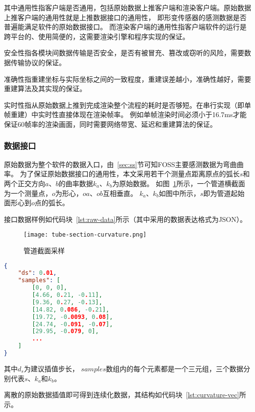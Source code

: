 其中通用性指客户端是否通用，包括原始数据上推客户端和渲染客户端。原始数据上推客户端的通用性就是上推数据接口的通用性，
即形变传感器的感测数据是否普遍能满足软件的原始数据接口。
而渲染客户端的通用性指客户端软件的运行是跨平台的、使用简便的，这需要渲染引擎和程序实现的保证。

安全性指各模块间数据传输是否安全，是否有被冒充、篡改或窃听的风险，需要数据传输协议的保证。

准确性指重建坐标与实际坐标之间的一致程度，重建误差越小，准确性越好，需要重建算法及其实现的保证。

实时性指从原始数据上推到完成渲染整个流程的耗时是否够短。在串行实现（即单帧重建）中实时性直接体现在渲染帧率。
例如单帧渲染时间必须小于16.7ms才能保证60帧率的渲染画面，同时需要网络带宽、延迟和重建算法的保证。

\subsubsection{数据接口}

原始数据为整个软件的数据入口，由~\ref{sec:ss}节可知FOSS主要感测数据为弯曲曲率。
为了保证原始数据接口的通用性，本文采用若干个测量点距离原点的弧长$s$和两个正交方向$a$、$b$的曲率数据$k_a$、$k_b$为原始数据。
如图~\ref{fig:tube-section}所示，一个管道横截面为一个测量点，$o$为形心，$oa$、$ob$互相垂直。
$k_a$、$k_b$如图中所示，$s$即为管道起始面形心到$o$点的弧长。

接口数据样例如代码块~\ref{lst:raw-data}所示（其中采用的数据表达格式为JSON\cite{rfc7159}）。

\begin{figure}
\centering
\texttt{[image: tube-section-curvature.png]}
\caption{管道截面采样}
\label{fig:tube-section} 
\end{figure}


\begin{lstlisting}[language=json,firstnumber=1,label={lst:raw-data},caption={原始曲率数据样例}]
{
    "ds": 0.01,
    "samples": [
        [0, 0, 0],
        [4.66, 0.21, -0.11],
        [9.36, 0.27, -0.13],
        [14.82, 0.086, -0.21],
        [19.72, -0.0093, 0.08],
        [24.74, -0.091, -0.07],
        [29.95, -0.079, 0],
        ...
    ]
}
\end{lstlisting}

其中$d_s$为建议插值步长，
$samples$数组内的每个元素都是一个三元组，三个数据分别代表$s$、$k_a$和$k_b$。

离散的原始数据插值即可得到连续化数据，其结构如代码块~\ref{lst:curvature-vec}所示。

